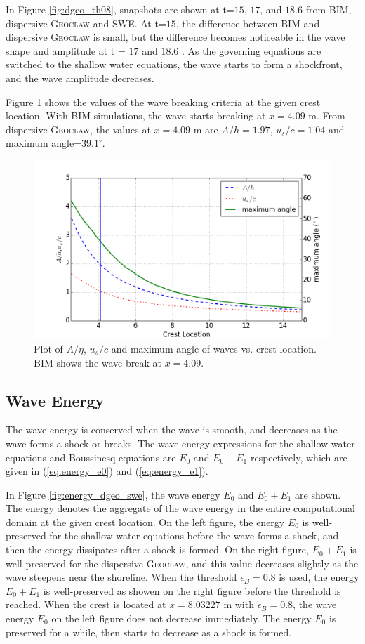 \documentclass[review]{elsarticle}
\begin{document}
In Figure \ref{fig:dgeo_th08}, snapshots are shown at 
t=$15$, $17$, and $18.6$ from BIM, dispersive \textsc{Geoclaw} 
and SWE.
At t=$15$, the difference between BIM and dispersive \textsc{Geoclaw}
is small, but the difference becomes noticeable 
in the wave shape and amplitude at t = $17$ and $18.6$ . 
As the governing equations are switched to the shallow water equations,
the wave starts to form a shockfront, and the wave amplitude decreases.

Figure \ref{fig:wave_break_criteria} shows 
the values of the wave breaking criteria at the given crest location. 
With BIM simulations, the wave starts breaking at $x=4.09$ m. 
From dispersive \textsc{Geoclaw}, the values at $x=4.09$ m are
$A/h=1.97$, $u_s/c=1.04$ and maximum angle=$39.1^\circ$. 

\begin{figure}[!htb]
\centering
\includegraphics[width=.7\textwidth]{_fig/wave_break}
\caption{Plot of $A/\eta$, $u_s/c$ and maximum angle of waves vs. crest location. 
BIM shows the wave break at $x=4.09$. }
\label{fig:wave_break_criteria}
\end{figure}

\subsection{Wave Energy}

The wave energy is conserved when the wave is smooth, 
and decreases as the wave forms a shock or breaks.
The wave energy expressions 
for the shallow water equations and Boussinesq equations
are $E_0$ and $E_0+E_1$  respectively, 
which are given in (\ref{eq:energy_e0}) and (\ref{eq:energy_e1}). 

In Figure \ref{fig:energy_dgeo_swe}, 
the wave energy $E_0$ and $E_0+E_1$ are shown. 
The energy denotes the aggregate 
of the wave energy in the entire computational domain 
at the given crest location.
On the left figure, 
the energy $E_0$ is well-preserved 
for the shallow water equations 
before the wave forms a shock,
and then the energy dissipates after a shock is formed.
On the right figure, 
$E_0+E_1$ is well-preserved for the dispersive \textsc{Geoclaw},
and this value decreases slightly as the wave steepens
near the shoreline.
When the threshold $\epsilon_B=0.8$ is used,
the energy $E_0+E_1$ is well-preserved 
as showen on the right figure before the threshold is reached. 
When the crest is located
at $x=8.03227$ m with $\epsilon_B=0.8$, 
the wave energy $E_0$ on the left figure 
does not decrease immediately.
The energy $E_0$ is preserved for a while, 
then starts to decrease as a shock is formed. 
\end{document}
